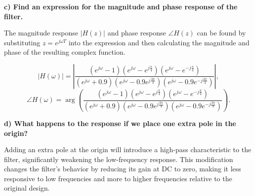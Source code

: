 \documentclass{article}
\begin{document}
\textbf{c) Find an expression for the magnitude and phase response of the filter.}

The magnitude response \( |H(z)| \) and phase response \( \angle H(z) \) can be found by substituting \( z = e^{j\omega T} \) into the expression and then calculating the magnitude and phase of the resulting complex function.


\[
|H(\omega)| = \left|\frac{(e^{j\omega} - 1)(e^{j\omega} - e^{j\frac{\pi}{4}})(e^{j\omega} - e^{-j\frac{\pi}{4}})}{(e^{j\omega} + 0.9)(e^{j\omega} - 0.9e^{j\frac{3\pi}{4}})(e^{j\omega} - 0.9e^{-j\frac{3\pi}{4}})}\right|,
\]
\[\angle H(\omega) = \arg\left(\frac{(e^{j\omega} - 1)(e^{j\omega} - e^{j\frac{\pi}{4}})(e^{j\omega} - e^{-j\frac{\pi}{4}})}{(e^{j\omega} + 0.9)(e^{j\omega} - 0.9e^{j\frac{3\pi}{4}})(e^{j\omega} - 0.9e^{-j\frac{3\pi}{4}})}\right).\]


\textbf{d) What happens to the response if we place one extra pole in the origin?}

Adding an extra pole at the origin will introduce a high-pass characteristic to the filter, significantly weakening the low-frequency response. This modification changes the filter's behavior by reducing its gain at DC to zero, making it less responsive to low frequencies and more to higher frequencies relative to the original design.
\end{document}
